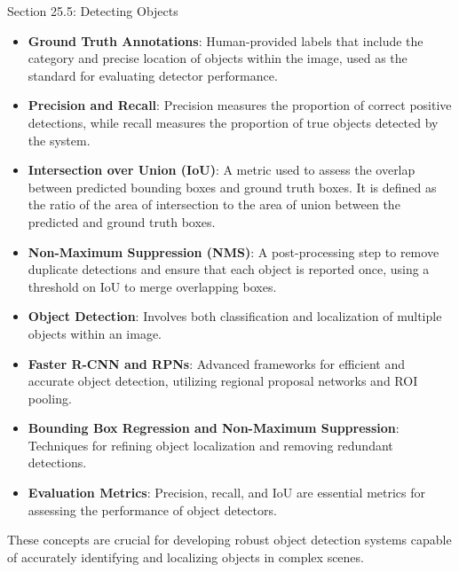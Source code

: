 \begin{notes}{Section 25.5: Detecting Objects}
\begin{highlight}
        \begin{itemize}
            \item \textbf{Ground Truth Annotations}: Human-provided labels that include the category and precise location of objects within the image, used as the standard for evaluating detector performance.
            \item \textbf{Precision and Recall}: Precision measures the proportion of correct positive detections, while recall measures the proportion of true objects detected by the system.
            \item \textbf{Intersection over Union (IoU)}: A metric used to assess the overlap between predicted bounding boxes and ground truth boxes. It is defined as the ratio of the area of intersection 
            to the area of union between the predicted and ground truth boxes.
            \item \textbf{Non-Maximum Suppression (NMS)}: A post-processing step to remove duplicate detections and ensure that each object is reported once, using a threshold on IoU to merge overlapping boxes.
        \end{itemize}
    
    \end{highlight}
    
    \begin{highlight}
    
        \begin{itemize}
            \item \textbf{Object Detection}: Involves both classification and localization of multiple objects within an image.
            \item \textbf{Faster R-CNN and RPNs}: Advanced frameworks for efficient and accurate object detection, utilizing regional proposal networks and ROI pooling.
            \item \textbf{Bounding Box Regression and Non-Maximum Suppression}: Techniques for refining object localization and removing redundant detections.
            \item \textbf{Evaluation Metrics}: Precision, recall, and IoU are essential metrics for assessing the performance of object detectors.
        \end{itemize}
    
        These concepts are crucial for developing robust object detection systems capable of accurately identifying and localizing objects in complex scenes.
    
    \end{highlight}
\end{notes}


